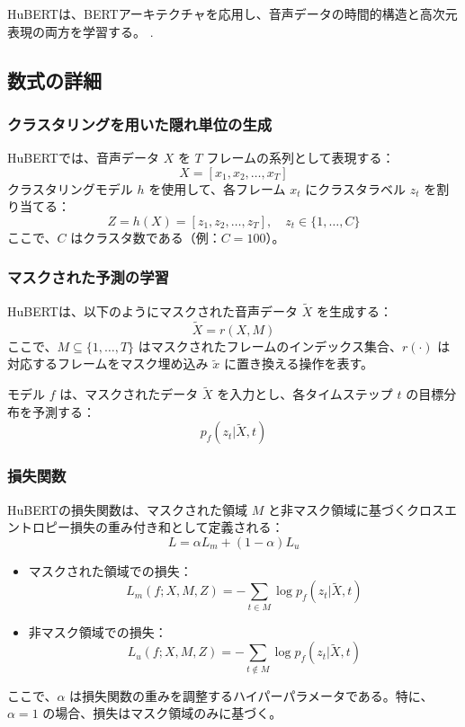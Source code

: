 \documentclass[10pt]{ltjsarticle}
\begin{document}
HuBERTは、BERTアーキテクチャを応用し、音声データの時間的構造と高次元表現の両方を学習する。
\cite{HuBERT}.

\subsection{数式の詳細}

\subsubsection{クラスタリングを用いた隠れ単位の生成}
HuBERTでは、音声データ \( X \) を \( T \) フレームの系列として表現する：
\[
X = [x_1, x_2, \dots, x_T]
\]
クラスタリングモデル \( h \) を使用して、各フレーム \( x_t \) にクラスタラベル \( z_t \) を割り当てる：
\[
Z = h(X) = [z_1, z_2, \dots, z_T], \quad z_t \in \{1, \dots, C\}
\]
ここで、\( C \) はクラスタ数である（例：\( C = 100 \)）。

\subsubsection{マスクされた予測の学習}
HuBERTは、以下のようにマスクされた音声データ \( \tilde{X} \) を生成する：
\[
\tilde{X} = r(X, M)
\]
ここで、\( M \subseteq \{1, \dots, T\} \) はマスクされたフレームのインデックス集合、\( r(\cdot) \) は対応するフレームをマスク埋め込み \( \tilde{x} \) に置き換える操作を表す。

モデル \( f \) は、マスクされたデータ \( \tilde{X} \) を入力とし、各タイムステップ \( t \) の目標分布を予測する：
\[
p_f(z_t | \tilde{X}, t)
\]

\subsubsection{損失関数}
HuBERTの損失関数は、マスクされた領域 \( M \) と非マスク領域に基づくクロスエントロピー損失の重み付き和として定義される：
\[
L = \alpha L_m + (1 - \alpha) L_u
\]
\begin{itemize}
    \item マスクされた領域での損失：
    \[
    L_m(f; X, M, Z) = -\sum_{t \in M} \log p_f(z_t | \tilde{X}, t)
    \]
    \item 非マスク領域での損失：
    \[
    L_u(f; X, M, Z) = -\sum_{t \notin M} \log p_f(z_t | \tilde{X}, t)
    \]
\end{itemize}
ここで、\( \alpha \) は損失関数の重みを調整するハイパーパラメータである。特に、\( \alpha = 1 \) の場合、損失はマスク領域のみに基づく。
\end{document}
